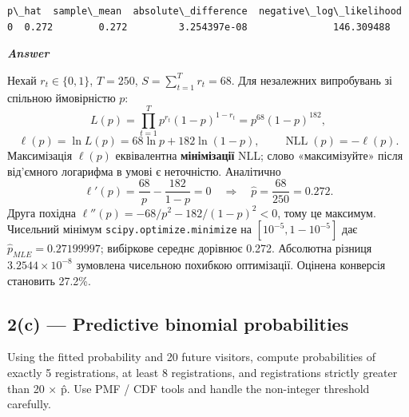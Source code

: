 \documentclass[11pt]{article}
\begin{document}
    
    \begin{Verbatim}[commandchars=\\\{\}]
   p\_hat  sample\_mean  absolute\_difference  negative\_log\_likelihood
0  0.272        0.272         3.254397e-08               146.309488
    \end{Verbatim}

    
    \textbf{\emph{Answer}}

Нехай \(r_t\in\{0,1\}\), \(T=250\), \(S=\sum_{t=1}^T r_t=68\). Для
незалежних випробувань зі спільною ймовірністю \(p\):
\[L(p)=\prod_{t=1}^{T}p^{r_t}(1-p)^{1-r_t}=p^{68}(1-p)^{182},\]
\[\ell(p)=\ln L(p)=68\ln p+182\ln(1-p),\qquad \operatorname{NLL}(p)=-\ell(p).\]
Максимізація \(\ell(p)\) еквівалентна \textbf{мінімізації} NLL; слово
«максимізуйте» після від'ємного логарифма в умові є неточністю.
Аналітично
\[\ell'(p)=\frac{68}{p}-\frac{182}{1-p}=0\quad\Longrightarrow\quad\widehat p=\frac{68}{250}=0.272.\]
Друга похідна \(\ell''(p)=-68/p^2-182/(1-p)^2<0\), тому це максимум.
Чисельний мінімум \texttt{scipy.optimize.minimize} на
\([10^{-5},1-10^{-5}]\) дає \(\widehat p_{MLE}=0.27199997\); вибіркове
середнє дорівнює 0.272. Абсолютна різниця \(3.2544\times 10^{-8}\)
зумовлена чисельною похибкою оптимізації. Оцінена конверсія становить
27.2\%.

    \subsection{2(c) --- Predictive binomial
probabilities}\label{c-predictive-binomial-probabilities}

Using the fitted probability and 20 future visitors, compute
probabilities of exactly 5 registrations, at least 8 registrations, and
registrations strictly greater than 20 × p̂. Use PMF / CDF tools and
handle the non-integer threshold carefully.
\end{document}
